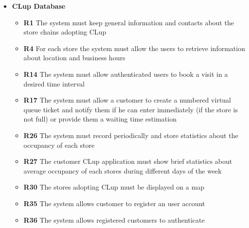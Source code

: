 \begin{itemize}
\begin{itemize}
          \end{itemize}
    \item \colorbox{clup_red}{\textbf{CLup Database}}
          \begin{itemize}
              \item \textbf{R1} The system must keep general information and contacts about the store chains adopting CLup
              \item \textbf{R4} For each store the system must allow the users to retrieve information about location and business hours
              \item \textbf{R14} The system must allow authenticated users to book a visit in a desired time interval
              \item \textbf{R17} The system must allow a customer to create a numbered virtual queue ticket and notify them if he can enter immediately (if the store is not full) or provide them a waiting time estimation
              \item \textbf{R26} The system must record periodically and store statistics about the occupancy of each store
              \item \textbf{R27} The customer CLup application must show brief statistics about average occupancy of each stores during different days of the week
              \item \textbf{R30} The stores adopting CLup must be displayed on a map
              \item \textbf{R35} The system allows customer to register an user account
              \item \textbf{R36} The system allows registered customers to authenticate
          \end{itemize}
\end{itemize}

\clearpage

